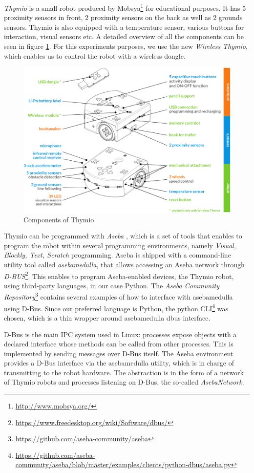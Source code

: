 \documentclass[format=acmsmall, review=false, screen=true]{acmart}
\begin{document}
\emph{Thymio} \cite{mondada2017thymio} is a small robot produced by Mobsya\footnote{\url{http://www.mobsya.org/}} for educational purposes. It has 5 proximity sensors in front, 2 proximity sensors on the back as well as 2 grounds sensors. Thymio is also equipped with a temperature sensor, various buttons for interaction, visual sensors etc. A detailed overview of all the components can be seen in figure \ref{fig:thymio}. For this experiments purposes, we use the new \emph{Wireless Thymio}, which enables us to control the robot with a wireless dongle.

\begin{figure}[H]
  \includegraphics[width=0.6\linewidth]{img/thymio.PNG}
  \caption{\label{fig:thymio}Components of Thymio}
\end{figure}

Thymio can be programmed with \emph{Aseba} \cite{retornaz2013seamless}, which is a set of tools that enables to program the robot within several programming environments, namely \emph{Visual, Blockly, Text, Scratch} programming. Aseba is shipped with a command-line utility tool called \emph{asebamedulla}, that allows accessing an Aseba network through \emph{D-BUS}\footnote{\url{https://www.freedesktop.org/wiki/Software/dbus/}}. This enables to program Aseba-enabled devices, the Thymio robot, using third-party languages, in our case Python. The \emph{Aseba Community Repository}\footnote{\url{https://github.com/aseba-community/aseba}} contains several examples of how to interface with asebamedulla using D-Bus. Since our preferred language is Python, the python CLI\footnote{\url{https://github.com/aseba-community/aseba/blob/master/examples/clients/python-dbus/aseba.py}} was chosen, which is a thin wrapper around asebamedulla dbus interface. 

D-Bus is the main IPC system used in Linux: processes expose objects with a declared interface whose methods can be called from other processes. This is implemented by sending messages over D-Bus itself. The Aseba environment provides a D-Bus interface via the asebamedulla utility, which is in charge of transmitting to the robot hardware. The abstraction is in the form of a network of Thymio robots and processes listening on D-Bus, the so-called \emph{AsebaNetwork}. 
\end{document}
